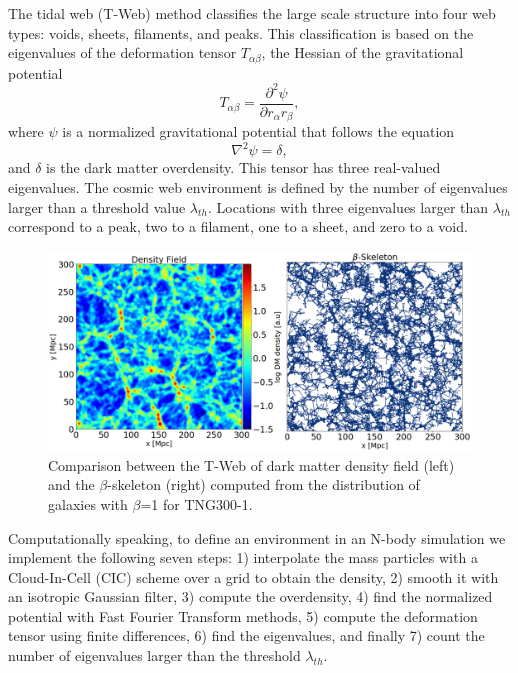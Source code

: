\documentclass[usenatbib]{mnras}
\begin{document}
The tidal web (T-Web) method \citep{Hahn2007, Forero-Romero2009}
classifies the large scale structure into four web types: voids,
sheets, filaments, and peaks.   
This classification is based on the eigenvalues of the deformation
tensor $T_{\alpha\beta}$, the Hessian of the gravitational potential 
\begin{equation}
T_{\alpha\beta}=\frac{\partial^2\psi}{\partial r_{\alpha}r_{\beta}},
\end{equation}
%
where $\psi$ is a normalized gravitational potential that follows the equation
\begin{equation}
    \nabla^2 \psi = \delta,
\end{equation}
%
and $\delta$ is the dark matter overdensity.
This tensor has three real-valued eigenvalues. 
The cosmic web environment is defined by the number of eigenvalues
larger than a threshold value $\lambda_{th}$.
Locations with three eigenvalues larger than $\lambda_{th}$ correspond
to a peak, two to a filament, one to a sheet, and zero to a void.


 
\begin{figure}
\centering
 \includegraphics[scale=0.3]{Figs/p_Fig1_.png}%
 \caption{Comparison between the T-Web of dark matter density field
   (left) and the $\beta$-skeleton (right) computed from the
   distribution of galaxies with $\beta$=1 for TNG300-1.}  
 \label{fig:TWebBsk}
\end{figure}


Computationally speaking, to define an environment in an N-body
simulation we implement the following seven steps: 1) interpolate the
mass particles with a Cloud-In-Cell (CIC) scheme over a grid to
obtain the density, 2) smooth it with an isotropic Gaussian filter,
3) compute the overdensity, 4) find the normalized potential with Fast
Fourier Transform  methods, 5) compute the deformation tensor using
finite differences, 6) find the eigenvalues, and finally 7) count the
number of eigenvalues larger than the threshold $\lambda_{th}$.  
\end{document}
